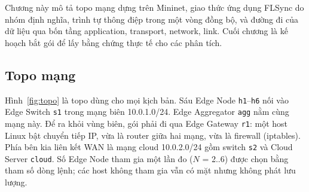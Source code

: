\setcounter{section}{3}
\setcounter{equation}{0}
Chương này mô tả topo mạng dựng trên Mininet, giao thức ứng dụng FLSync do nhóm định nghĩa, trình tự thông điệp trong một vòng đồng bộ, và đường đi của dữ liệu qua bốn tầng application, transport, network, link. Cuối chương là kế hoạch bắt gói để lấy bằng chứng thực tế cho các phân tích.

\subsection{Topo mạng}
Hình~\ref{fig:topo} là topo dùng cho mọi kịch bản. Sáu Edge Node \texttt{h1}--\texttt{h6} nối vào Edge Switch \texttt{s1} trong mạng biên 10.0.1.0/24. Edge Aggregator \texttt{agg} nằm cùng mạng này. Để ra khỏi vùng biên, gói phải đi qua Edge Gateway \texttt{r1}: một host Linux bật chuyển tiếp IP, vừa là router giữa hai mạng, vừa là firewall (iptables). Phía bên kia liên kết WAN là mạng cloud 10.0.2.0/24 gồm switch \texttt{s2} và Cloud Server \texttt{cloud}. Số Edge Node tham gia một lần đo ($N$ = 2..6) được chọn bằng tham số dòng lệnh; các host không tham gia vẫn có mặt nhưng không phát lưu lượng.

